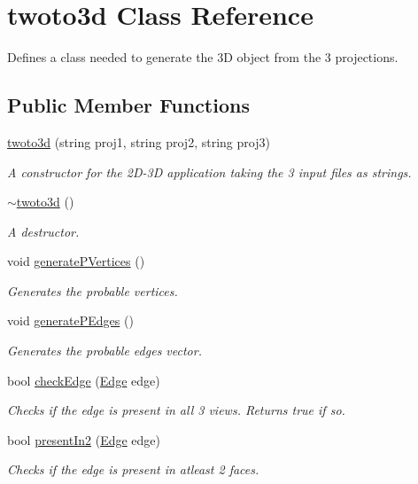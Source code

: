 \hypertarget{classtwoto3d}{}\section{twoto3d Class Reference}
\label{classtwoto3d}


Defines a class needed to generate the 3D object from the 3 projections.  


\subsection*{Public Member Functions}
\begin{DoxyCompactItemize}
\item 
\mbox{\hyperlink{classtwoto3d_a22a5092922477075c8676947551e9476}{twoto3d}} (string proj1, string proj2, string proj3)
\begin{DoxyCompactList}\small\item\em A constructor for the 2\+D-\/3D application taking the 3 input files as strings. \end{DoxyCompactList}\item 
\mbox{\label{classtwoto3d_afeaec5d8c3af0f3d233d687ab3532d9a}} 
\mbox{\hyperlink{classtwoto3d_afeaec5d8c3af0f3d233d687ab3532d9a}{$\sim$twoto3d}} ()
\begin{DoxyCompactList}\small\item\em A destructor. \end{DoxyCompactList}\item 
void \mbox{\hyperlink{classtwoto3d_a7b7f3f38be16773db7b155f0be8fce6b}{generate\+P\+Vertices}} ()
\begin{DoxyCompactList}\small\item\em Generates the probable vertices. \end{DoxyCompactList}\item 
void \mbox{\hyperlink{classtwoto3d_a602e716fedf63b73954edb1e084e4b3a}{generate\+P\+Edges}} ()
\begin{DoxyCompactList}\small\item\em Generates the probable edges vector. \end{DoxyCompactList}\item 
bool \mbox{\hyperlink{classtwoto3d_a7fdf12ceaffa00e9c0181ae1bcf30614}{check\+Edge}} (\mbox{\hyperlink{struct_edge}{Edge}} edge)
\begin{DoxyCompactList}\small\item\em Checks if the edge is present in all 3 views. Returns true if so. \end{DoxyCompactList}\item 
\mbox{\label{classtwoto3d_a2fdbf0e85b7c554e5d0cce5624ccf341}} 
bool \mbox{\hyperlink{classtwoto3d_a2fdbf0e85b7c554e5d0cce5624ccf341}{present\+In2}} (\mbox{\hyperlink{struct_edge}{Edge}} edge)
\begin{DoxyCompactList}\small\item\em Checks if the edge is present in atleast 2 faces. \end{DoxyCompactList}\end{DoxyCompactItemize}
